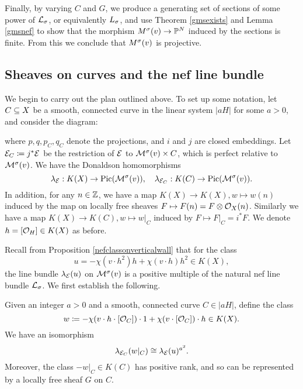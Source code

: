 Finally, by varying $C$ and $G$, we produce a generating set of sections of some power of $\mathcal{L}_\sigma$, or equivalently $L_\sigma$, and use Theorem \ref{gmsexists} and Lemma \ref{gmsnef} to show that the morphism $M^\sigma(v) \to \mathbb{P}^N$ induced by the sections is finite. From this we conclude that $M^\sigma(v)$ is projective.

\subsection{Sheaves on curves and the nef line bundle}
We begin to carry out the plan outlined above. To set up some notation, let $C \subseteq X$ be a smooth, connected curve in the linear system $|a H|$ for some $a > 0$, and consider the diagram:
\begin{center}
\end{center}
where $p, q, p_C, q_C$ denote the projections, and $i$ and $j$ are closed embeddings. Let $\mathcal{E}_C \coloneqq j^*\mathcal{E}$ be the restriction of $\mathcal{E}$ to $\mathcal{M}^\sigma(v) \times C$, which is perfect relative to $\mathcal{M}^\sigma(v)$. We have the Donaldson homomorphisms
\[ \lambda_{\mathcal{E}}: K(X) \to \mathrm{Pic}(\mathcal{M}^\sigma(v)), \quad \lambda_{\mathcal{E}_C}: K(C) \to \mathrm{Pic}(\mathcal{M}^\sigma(v)). \]
In addition, for any $n \in \mathbb{Z}$, we have a map $K(X) \to K(X), w \mapsto w(n)$ induced by the map on locally free sheaves $F \mapsto F(n) = F \otimes \mathcal{O}_X(n)$. Similarly we have a map $K(X) \to K(C), w \mapsto w|_C$ induced by $F \mapsto F|_C = i^*F$. We denote $h = [\mathcal{O}_H] \in K(X)$ as before.

Recall from Proposition \ref{nefclassonverticalwall} that for the class 
\[ u = -\chi(v \cdot h^2) h + \chi(v \cdot h) h^2 \in K(X), \]
the line bundle $\lambda_{\mathcal{E}}(u)$ on $\mathcal{M}^\sigma(v)$ is a positive multiple of the natural nef line bundle $\mathcal{L}_\sigma$. We first establish the following.
\begin{propdef}\label{nefpowerfromcurves}
    Given an integer $a > 0$ and a smooth, connected curve $C \in |a H|$, define the class
    \[ w \coloneqq -\chi(v \cdot h \cdot [\mathcal{O}_C]) \cdot 1 + \chi(v \cdot [\mathcal{O}_C]) \cdot h \in K(X). \]
    We have an isomorphism
    \[ \lambda_{\mathcal{E}_C}(w|_C) \cong \lambda_{\mathcal{E}}(u)^{a^2}. \]
    Moreover, the class $-w|_C \in K(C)$ has positive rank, and so can be represented by a locally free sheaf $G$ on $C$.
\end{propdef}


